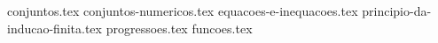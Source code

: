 \documentclass[a4paper,12pt, oneside]{book}
\begin{document}
    \nocite{*}
    \thispagestyle{empty}       %

    \printtitle                 %
        \vfill
    \printauthor                %
    \newpage
    
    \frontmatter %
    \tableofcontents
    \mainmatter %
    
    {
        \newcommand{\templatesdir}{src/esqueletos-dos-capitulos/}

        {conjuntos.tex}
        {conjuntos-numericos.tex}
        {equacoes-e-inequacoes.tex}
        {principio-da-inducao-finita.tex}
        {progressoes.tex}
        {funcoes.tex}
    }
    
    \begin{comment}
    \chapter{Funções}
    {introducao.tex}
    {definicao.tex}
    {compostas.tex}
    {inversa.tex}
    {inj-sobr.tex}
    {formulas-e-funcoes.tex}
    {cardinalidade.tex}
    \end{comment}
\end{document}
